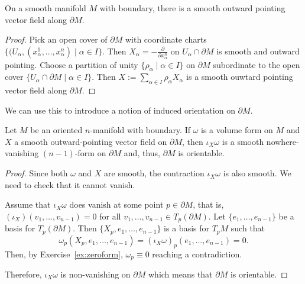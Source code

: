 \begin{proposition}
  On a smooth manifold $M$ with boundary, there is a smooth outward pointing vector field along $\partial M$.  
\end{proposition}
\begin{proof}
  Pick an open cover of $\partial M$ with coordinate charts $\{(U_\alpha, (x^1_\alpha,\ldots,x^n_\alpha) \mid \alpha\in I\}$.
  Then $X_\alpha = -\frac{\partial}{\partial x^n_\alpha}$ on $U_\alpha\cap \partial M$ is smooth and outward pointing.
  Choose a partition of unity $\{\rho_\alpha \mid \alpha\in I\}$ on $\partial M$ subordinate to the open cover $\{U_\alpha\cap \partial M \mid \alpha\in I\}$.
  Then $X:= \sum_{\alpha\in I}\rho_\alpha X_\alpha$ is a smooth ouwtard pointing vector field along $\partial M$.
\end{proof}

We can use this to introduce a notion of induced orientation on $\partial M$.

\begin{proposition}
  Let $M$ be an oriented $n$-manifold with boundary.
  If $\omega$ is a volume form on $M$ and $X$ a smooth outward-pointing vector field on $\partial M$, then $\iota_X\omega$ is a smooth nowhere-vanishing $(n-1)$-form on $\partial M$ and, thus, $\partial M$ is orientable.
\end{proposition}
\begin{proof}
  Since both $\omega$ and $X$ are smooth, the contraction $\iota_X\omega$ is also smooth.
  We need to check that it cannot vanish.

  Assume that $\iota_X\omega$ does vanish at some point $p\in\partial M$, that is, $(\iota_X)(v_1, \ldots, v_{n-1}) = 0$ for all $v_1, \ldots, v_{n-1}\in T_p(\partial M)$.
  Let $\{e_1,\ldots,e_{n-1}\}$ be a basis for $T_p(\partial M)$.
  Then $\{X_p,e_1,\ldots,e_{n-1}\}$ is a basis for $T_p M$ such that
  \begin{equation}
    \omega_p(X_p, e_1, \ldots, e_{n-1}) = (\iota_X\omega)_p(e_1, \ldots, e_{n-1}) = 0.
  \end{equation}
  Then, by Exercise~\ref{ex:zeroform}, $\omega_p\equiv0$ reaching a contradiction.
  
  Therefore, $\iota_X\omega$ is non-vanishing on $\partial M$ which means that $\partial M$ is orientable.
\end{proof}


